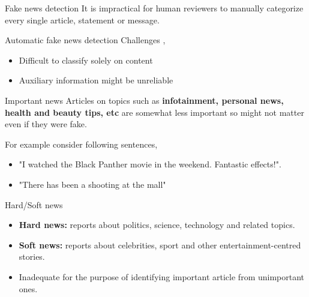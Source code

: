 \documentclass[12pt]{beamer}
\begin{document}
\begin{frame}{Fake news detection}
    It is impractical for human reviewers to manually categorize every single article, statement or message.
\end{frame}

\begin{frame}{Automatic fake news detection}
    Challenges \autocite{shu2017fake},
    \begin{itemize}
        \item Difficult to classify solely on content
        \item Auxiliary information might be unreliable
    \end{itemize}
\end{frame}

\begin{frame}{Important news}
    Articles on topics such as \textbf{infotainment, personal news, health and beauty tips, etc} are somewhat less important so might not matter even if they were fake.

    For example consider following sentences,
    \begin{itemize}
        \item "I watched the Black Panther movie in the weekend. Fantastic effects!". 
        \item "There has been a shooting at the mall"
    \end{itemize}
\end{frame}

\begin{frame}{Hard/Soft news}
    \begin{itemize}
        \item \textbf{Hard news:} reports about politics,  science, technology and related topics. \autocite{reinemann2012hard}
        \item \textbf{Soft news:} reports about celebrities, sport and other entertainment-centred stories. \autocite{reinemann2012hard}
        \item Inadequate for the purpose of identifying important article from unimportant ones.
    \end{itemize}
\end{frame}
\end{document}
